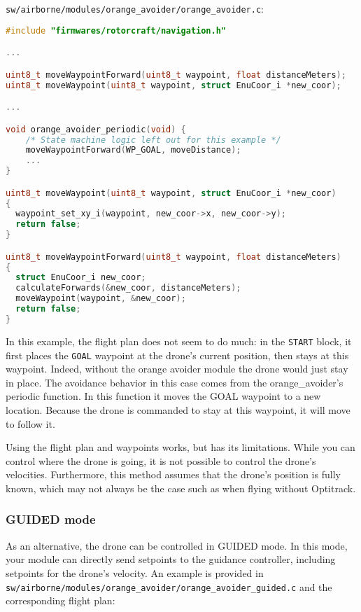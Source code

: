\documentclass{article}
\begin{document}
\texttt{sw/airborne/modules/orange\_avoider/orange\_avoider.c}:
\begin{lstlisting}[language=c]
#include "firmwares/rotorcraft/navigation.h"

...

uint8_t moveWaypointForward(uint8_t waypoint, float distanceMeters);
uint8_t moveWaypoint(uint8_t waypoint, struct EnuCoor_i *new_coor);

...

void orange_avoider_periodic(void) {
	/* State machine logic left out for this example */
	moveWaypointForward(WP_GOAL, moveDistance);
	...
}

uint8_t moveWaypoint(uint8_t waypoint, struct EnuCoor_i *new_coor)
{
  waypoint_set_xy_i(waypoint, new_coor->x, new_coor->y);
  return false;
}

uint8_t moveWaypointForward(uint8_t waypoint, float distanceMeters)
{
  struct EnuCoor_i new_coor;
  calculateForwards(&new_coor, distanceMeters);
  moveWaypoint(waypoint, &new_coor);
  return false;
}
\end{lstlisting}

In this example, the flight plan does not seem to do much: in the \texttt{START} block, it first places the \texttt{GOAL} waypoint at the drone's current position, then stays at this waypoint. Indeed, without the orange avoider module the drone would just stay in place. The avoidance behavior in this case comes from the orange\_avoider's periodic function. In this function it moves the GOAL waypoint to a new location. Because the drone is commanded to stay at this waypoint, it will move to follow it.

Using the flight plan and waypoints works, but has its limitations. While you can control where the drone is going, it is not possible to control the drone's velocities. Furthermore, this method assumes that the drone's position is fully known, which may not always be the case such as when flying without Optitrack.

\subsubsection{GUIDED mode}
As an alternative, the drone can be controlled in GUIDED mode. In this mode, your module can directly send setpoints to the guidance controller, including setpoints for the drone's velocity. An example is provided in \texttt{sw/airborne/modules/orange\_avoider/orange\_avoider\_guided.c} and the corresponding flight plan:
\end{document}
